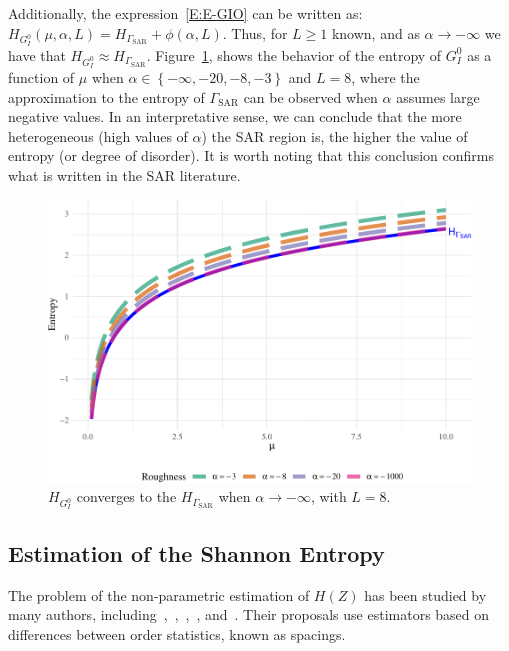 Additionally, the expression~\eqref{E:E-GIO} can be written as: $H_{G_I^0}(\mu, \alpha, L)=H_{\Gamma_{\text{SAR}}}+\phi(\alpha, L)$. Thus, for $L\geq1$ known, and as \(\alpha\to-\infty\) we have that $H_{G_I^0}\approx H_{\Gamma_{\text{SAR}}}$. 
Figure~\ref{fig:Plot_GI0_to_gamma1}, shows the behavior of the entropy
of \(G_I^0\) as a function of $\mu$ when \(\alpha \in \left\{-\infty, -20, -8, -3\right\}\) and $L=8$,
where the approximation to the entropy of \(\Gamma_{\text{SAR}}\) can be
observed when \(\alpha\) assumes large negative values. In an
interpretative sense, we can conclude that the more heterogeneous (high
values of \(\alpha\)) the SAR region is, the higher the value of entropy
(or degree of disorder). It is worth noting that this conclusion
confirms what is written in the SAR literature.


\begin{figure}[htb]

{\centering \includegraphics[width=0.7\linewidth]{../../Figures/PDF/Plot_GI0_to_gamma1-1} 

}

\caption{$H_{ G_I^0}$ converges to the $H_{\Gamma_{\text{SAR}}}$ when $\alpha\to-\infty$, with $L=8$.}\label{fig:Plot_GI0_to_gamma1}
\end{figure}

\subsection{Estimation of the Shannon
Entropy}\label{estimation-of-the-shannon-entropy}

The problem of the non-parametric estimation of \(H(Z)\) has been
studied by many authors, including~\citet{vasicek1976test},~\citet{correa1995new},~\citet{Wieczorkowski1999},~\citet{Yee2015}, and~\citet{AlOmari2019}.
Their proposals use estimators based on differences between order statistics, known as spacings.

